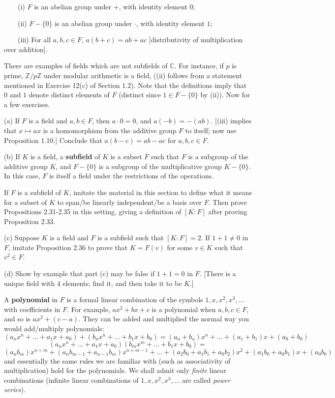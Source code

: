 \documentclass[leqno]{book}
\begin{document}
\begin{enumerate}
~~~~(i) $F$ is an abelian group under $+$, with identity element $0$;

~~~~(ii) $F-\{0\}$ is an abelian group under $\cdot$, with identity element $1$;

~~~~(iii) For all $a,b,c\in F$, $a(b+c)=ab+ac$ [distributivity of multiplication over addition].

There are examples of fields which are not subfields of $\mathbb C$.  For instance, if $p$ is prime, $\mathbb Z/p\mathbb Z$ under modular arithmetic is a field, ((ii) follows from a statement mentioned in Exercise 12(c) of Section 1.2).  Note that the definitions imply that $0$ and $1$ denote distinct elements of $F$ (distinct since $1\in F-\{0\}$ by (ii)).  Now for a few exercises.

(a) If $F$ is a field and $a,b\in F$, then $a\cdot 0=0$, and $a(-b)=-(ab)$.  [(iii) implies that $x\mapsto ax$ is a homomorphism from the additive group $F$ to itself; now use Proposition 1.10.]  Conclude that $a(b-c)=ab-ac$ for $a,b,c\in F$.

(b) If $K$ is a field, a \textbf{subfield} of $K$ is a subset $F$ such that $F$ is a subgroup of the additive group $K$, and $F-\{0\}$ is a subgroup of the multiplicative group $K-\{0\}$.  In this case, $F$ is itself a field under the restrictions of the operations.

If $F$ is a subfield of $K$, imitate the material in this section to define what it means for a subset of $K$ to span/be linearly independent/be a basis over $F$.  Then prove Propositions 2.31-2.35 in this setting, giving a definition of $[K:F]$ after proving Proposition 2.33.

(c) Suppose $K$ is a field and $F$ is a subfield such that $[K:F]=2$.  If $1+1\ne 0$ in $F$, imitate Proposition 2.36 to prove that $K=F(v)$ for some $v\in K$ such that $v^2\in F$.

(d) Show by example that part (c) may be false if $1+1=0$ in $F$.  [There is a unique field with $4$ elements; find it, and then take it to be $K$.]

A \textbf{polynomial} in $F$ is a formal linear combination of the symbols $1,x,x^2,x^3,\dots$ with coefficients in $F$.  For example, $ax^2+bx+c$ is a polynomial when $a,b,c\in F$, and so is $ax^2+(c-a)$.  They can be added and multiplied the normal way you would add/multiply polynomials:
$$(a_nx^n+\dots+a_1x+a_0)+(b_nx^n+\dots+b_1x+b_0)=(a_n+b_n)x^n+\dots+(a_1+b_1)x+(a_0+b_0)$$
$$(a_nx^n+\dots+a_1x+a_0)(b_mx^m+\dots+b_1x+b_0)=$$
$$(a_nb_m)x^{n+m}+(a_nb_{m-1}+a_{n-1}b_m)x^{n+m-1}+\dots+(a_2b_0+a_1b_1+a_0b_2)x^2+(a_1b_0+a_0b_1)x+(a_0b_0)$$
and essentially the same rules we are familiar with (such as associativity of multiplication) hold for the polynomials.  We shall admit only \emph{finite} linear combinations (infinite linear combinations of $1,x,x^2,x^3,\dots$ are called \emph{power series}).


\end{enumerate}
\end{document}
